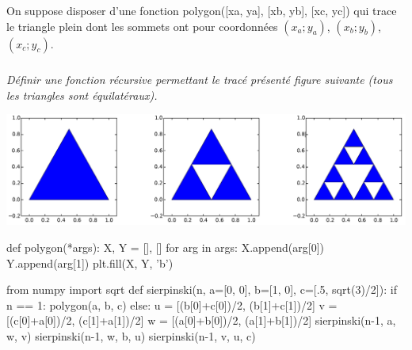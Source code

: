 \documentclass[10pt,fleqn]{book} %
\begin{document}
\begin{multicols}{2}
On suppose disposer d’une fonction \textsf{polygon([xa, ya], [xb, yb], [xc, yc])} qui trace le
triangle plein dont les sommets ont pour coordonnées $(x_a;y_a)$, $(x_b;y_b)$, $(x_c;y_c)$. 
\subparagraph{}
\textit{Définir une fonction récursive permettant le tracé présenté figure suivante (tous les triangles sont équilatéraux).}

\begin{center}
\includegraphics[width=.95\linewidth]{images/fig_04}
\end{center}

\ifprof
\begin{corrige}
\begin{python}
def polygon(*args):
    X, Y = [], []
    for arg in args:
        X.append(arg[0])
        Y.append(arg[1])
    plt.fill(X, Y, 'b')
    
from numpy import sqrt
def sierpinski(n, a=[0, 0], b=[1, 0], c=[.5, sqrt(3)/2]):
    if n == 1:
        polygon(a, b, c)
    else:
        u = [(b[0]+c[0])/2, (b[1]+c[1])/2]
        v = [(c[0]+a[0])/2, (c[1]+a[1])/2]
        w = [(a[0]+b[0])/2, (a[1]+b[1])/2]
        sierpinski(n-1, a, w, v)
        sierpinski(n-1, w, b, u)
        sierpinski(n-1, v, u, c)
\end{python}
\end{corrige}
\else
\fi



\ifprof
\else
\end{multicols}
\fi


\end{document}

